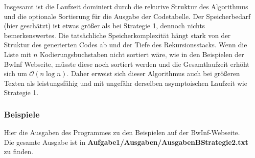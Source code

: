 \documentclass[a4paper,10pt,ngerman]{scrartcl}
\begin{document}
\vspace{1em}
Insgesamt ist die Laufzeit dominiert durch die rekurive Struktur des Algorithmus und die optionale Sortierung für die Ausgabe der Codetabelle. Der Speicherbedarf (hier geschätzt) ist etwas größer als bei Strategie 1, dennoch nichts bemerkenswertes. Die tatsächliche Speicherkomplexität hängt stark von der Struktur des generierten Codes ab und der Tiefe des Rekursionsstacks.
\newline
Wenn die Liste mit $n$ Kodierungsbuchstaben nicht sortiert wäre, wie in den Beispielen der BwInf Webseite, müsste diese noch sortiert werden und die Gesamtlaufzeit erhöht sich um $\mathcal{O}(n \log n)$. 
Daher erweist sich dieser Algorithmus auch bei größeren Texten als leistungsfähig und mit ungefähr derselben asymptoischen Laufzeit wie Strategie 1.

\subsubsection{Beispiele}
Hier die Ausgaben des Programmes zu den Beispielen auf der BwInf-Webseite. \\Die gesamte Ausgabe ist in \textbf{Aufgabe1/Ausgaben/AusgabenBStrategie2.txt} zu finden.
\end{document}
